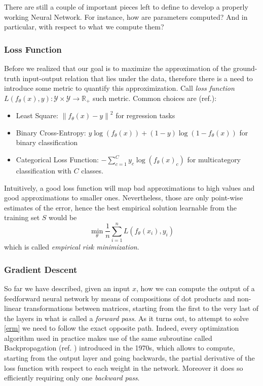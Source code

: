 \documentclass[LaM,binding=0.6cm]{./packages/sapthesis/sapthesis}
\newcommand{\norm}[1]{\left\lVert#1\right\rVert}
\begin{document}
            There are still a couple of important pieces left to define to develop a properly working Neural Network. For instance, how are parameters computed? And in particular, with respect to what we compute them? 
            \subsubsection{Loss Function}
                Before we realized that our goal is to maximize the approximation of the ground-truth input-output relation that lies under the data, therefore there is a need to
                introduce some metric to quantify this approximization. Call \textit{loss function} $ L(f_{\theta}\left(x\right), y) \colon \mathcal{Y} \times \mathcal{Y} \to \mathbb{R_+}$ 
                such metric. Common choices are (ref.):
                \begin{itemize}
                    \item Least Square: $\norm{f_{\theta}\left(x\right) - y}^2$ for regression tasks 
                    \item Binary Cross-Entropy: $y \log (f_{\theta}(x))+(1-y) \log (1-f_{\theta}(x))$ for binary classification  
                    \item Categorical Loss Function: $-\sum_{c=1}^{C} y_{c} \log \left(f_{\theta}(x)_c\right)$ for multicategory classification with $C$ classes.
                \end{itemize}
                Intuitively, a good loss function will map bad approximations to high values and good approximations to smaller ones.
                Nevertheless, those are only point-wise estimates of the error, hence the best empirical solution learnable from the training set $ S $ would be 
                \begin{equation}
                    \label{erm}
                    \displaystyle{  \min_{\theta}  \frac{1}{n} \sum_{i=1}^{n} L\left(f_{\theta}\left(x_{i}\right), y_{i}\right) }
                \end{equation}
                which is called \textit{empirical risk minimization}.
            \subsubsection{Gradient Descent}
               So far we have described, given an input $ x $, how we can compute the output of a feedforward neural network by means of compositions of dot products 
               and non-linear transformations between matrices, starting from the first to the very last of the layers in what is called a \textit{forward pass}. As it turns out, to attempt to solve \ref{erm} we need to follow the exact
               opposite path. Indeed, every optimization algorithm used in practice makes use of the same subroutine called Backpropagation (ref.  ) introduced in the 1970s, which allows to compute, starting from the output layer
               and going backwards, the partial derivative of the loss function with respect to each weight in the network. Moreover it does so efficiently requiring only one \textit{backward pass}.
\end{document}
